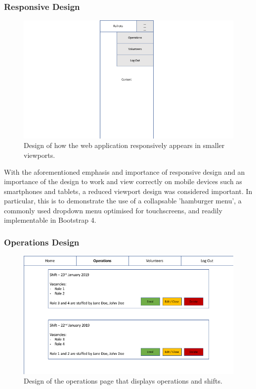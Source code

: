 \subsubsection{Responsive Design}
\begin{figure}[h]
    \includegraphics[width=1.0\textwidth]{Figures/design-mobile}
    \caption{Design of how the web application responsively appears in smaller viewports.}
    \label{fig:mobile}
\end{figure}

With the aforementioned emphasis and importance of responsive design and an importance of the design to work and view correctly on mobile devices such as smartphones and tablets, a reduced viewport design was considered important. In particular, this is to demonstrate the use of a collapsable 'hamburger menu', a commonly used dropdown menu optimised for touchscreens, and readily implementable in Bootstrap 4. \cite{Bootstrap4}

\subsubsection{Operations Design}
\begin{figure}[h]
    \includegraphics[width=1.0\textwidth]{Figures/design-operations}
    \caption{Design of the operations page that displays operations and shifts.}
    \label{fig:operations}
\end{figure}

